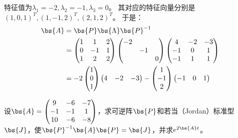 \documentclass[12pt, a4paper, oneside, UTF8]{ctexbook}
\begin{document}
\begin{solution}
    特征值为$\lambda_1=-2,\lambda_2=-1,\lambda_3=0$。
    其对应的特征向量分别是$(1,0,1)^T,(1,-1,2)^T,(2,1,2)^T$。
    于是：
    \begin{align*}
        \bs{A}
        &=\bs{P}\bs{\Lambda}\bs{P}^{-1}\\
        &=
        \begin{pmatrix}
            1&1&2\\
            0&-1&1\\
            1&2&2
        \end{pmatrix}\begin{pmatrix}
            -2& & \\
            & -1& \\
            & & 0
        \end{pmatrix}\begin{pmatrix}
            4	&-2	&-3\\
            -1&0&1\\
            -1&	1&	1
        \end{pmatrix}\\
        &=-2\begin{pmatrix}
            1\\
            0\\
            1
        \end{pmatrix}\begin{pmatrix}
            4&-2&-3
        \end{pmatrix}
        -\begin{pmatrix}
            1\\
            -1\\
            2
        \end{pmatrix}\begin{pmatrix}
            -1&0&1
        \end{pmatrix}
    \end{align*}
    
\end{solution}


\begin{question}
    设$\bs{A}=\begin{pmatrix}
        9&-6&-7\\
        -1&-1&1\\
        10&-6&-8
    \end{pmatrix}$，求可逆阵$\bs{P}$和若当（Jordan）标准型$\bs{J}$，使$\bs{P}^{-1}\bs{A}\bs{P}=\bs{J}$，并求$e^{2\bs{A}t}$。
\end{question}
\end{document}
